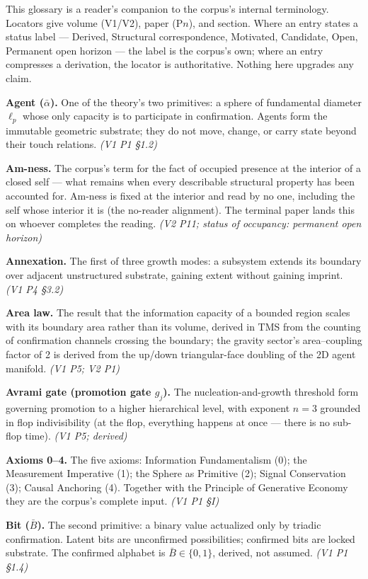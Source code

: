 \documentclass[11pt,oneside]{report}
\theoremstyle{definition}
\theoremstyle{remark}
\begin{document}
This glossary is a reader's companion to the corpus's internal terminology. Locators give volume (V1/V2), paper (P\ensuremath{n}), and section. Where an entry states a status label --- Derived, Structural correspondence, Motivated, Candidate, Open, Permanent open horizon --- the label is the corpus's own; where an entry compresses a derivation, the locator is authoritative. Nothing here upgrades any claim.

\textbf{Agent ($\bar{\alpha}$).} One of the theory's two primitives: a sphere of fundamental diameter $\ell_p$ whose only capacity is to participate in confirmation. Agents form the immutable geometric substrate; they do not move, change, or carry state beyond their touch relations. \emph{(V1 P1 \S 1.2)}

\textbf{Am-ness.} The corpus's term for the fact of occupied presence at the interior of a closed self --- what remains when every describable structural property has been accounted for. Am-ness is fixed at the interior and read by no one, including the self whose interior it is (the no-reader alignment). The terminal paper lands this on whoever completes the reading. \emph{(V2 P11; status of occupancy: permanent open horizon)}

\textbf{Annexation.} The first of three growth modes: a subsystem extends its boundary over adjacent unstructured substrate, gaining extent without gaining imprint. \emph{(V1 P4 \S 3.2)}

\textbf{Area law.} The result that the information capacity of a bounded region scales with its boundary area rather than its volume, derived in TMS from the counting of confirmation channels crossing the boundary; the gravity sector's area--coupling factor of 2 is derived from the up/down triangular-face doubling of the 2D agent manifold. \emph{(V1 P5; V2 P1)}

\textbf{Avrami gate (promotion gate $g_j$).} The nucleation-and-growth threshold form governing promotion to a higher hierarchical level, with exponent $n=3$ grounded in flop indivisibility (at the flop, everything happens at once --- there is no sub-flop time). \emph{(V1 P5; derived)}

\textbf{Axioms 0--4.} The five axioms: Information Fundamentalism (0); the Measurement Imperative (1); the Sphere as Primitive (2); Signal Conservation (3); Causal Anchoring (4). Together with the Principle of Generative Economy they are the corpus's complete input. \emph{(V1 P1 \S I)}

\textbf{Bit ($\bar{B}$).} The second primitive: a binary value actualized only by triadic confirmation. Latent bits are unconfirmed possibilities; confirmed bits are locked substrate. The confirmed alphabet is $\bar{B}\in\{0,1\}$, derived, not assumed. \emph{(V1 P1 \S 1.4)}
\end{document}
